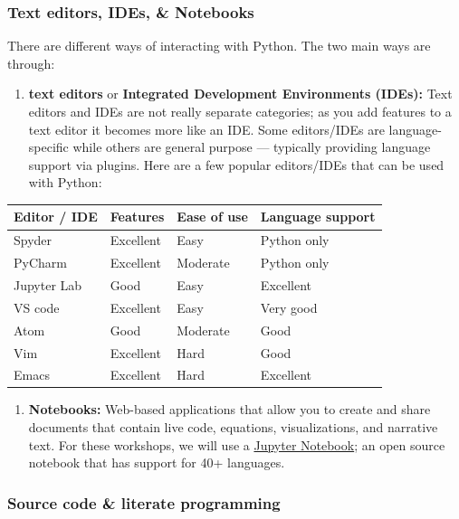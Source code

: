 \documentclass[
]{book}
\providecommand{\tightlist}{%
  \setlength{\itemsep}{0pt}\setlength{\parskip}{0pt}}
\begin{document}
\hypertarget{text-editors-ides-notebooks-1}{%
\subsubsection{Text editors, IDEs, \& Notebooks}\label{text-editors-ides-notebooks-1}}

There are different ways of interacting with Python. The two main ways are through:

\begin{enumerate}
\def\labelenumi{\arabic{enumi}.}
\tightlist
\item
  \textbf{text editors} or \textbf{Integrated Development Environments (IDEs):} Text editors and IDEs are not really separate categories; as you add features to a text editor it becomes more like an IDE. Some editors/IDEs are language-specific while others are general purpose --- typically providing language support via plugins. Here are a few popular editors/IDEs that can be used with Python:
\end{enumerate}

\begin{longtable}[]{@{}llll@{}}
\toprule
Editor / IDE & Features & Ease of use & Language support\tabularnewline
\midrule
\endhead
Spyder & Excellent & Easy & Python only\tabularnewline
PyCharm & Excellent & Moderate & Python only\tabularnewline
Jupyter Lab & Good & Easy & Excellent\tabularnewline
VS code & Excellent & Easy & Very good\tabularnewline
Atom & Good & Moderate & Good\tabularnewline
Vim & Excellent & Hard & Good\tabularnewline
Emacs & Excellent & Hard & Excellent\tabularnewline
\bottomrule
\end{longtable}

\begin{enumerate}
\def\labelenumi{\arabic{enumi}.}
\setcounter{enumi}{1}
\tightlist
\item
  \textbf{Notebooks:} Web-based applications that allow you to create and share documents that contain live code, equations, visualizations, and narrative text. For these workshops, we will use a \href{https://jupyter.org/}{Jupyter Notebook}; an open source notebook that has support for 40+ languages.
\end{enumerate}

\hypertarget{source-code-literate-programming-1}{%
\subsubsection{Source code \& literate programming}\label{source-code-literate-programming-1}}
\end{document}
